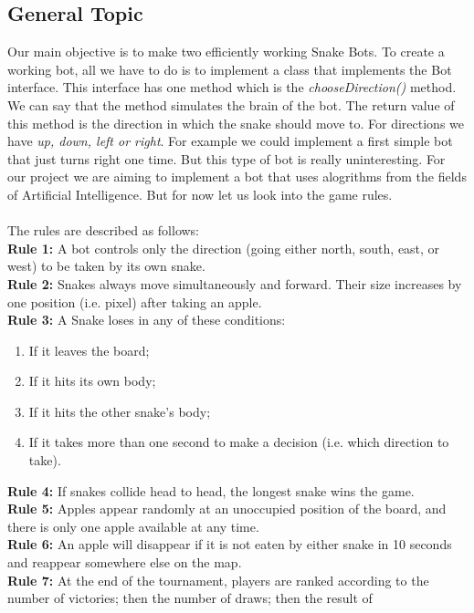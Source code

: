 \documentclass[a4paper,12pt]{article}
\begin{document}
\subsection{General Topic}
Our main objective is to make two efficiently working Snake Bots. To create a working bot, all we have to do is to implement a class that implements the Bot interface. This interface has one method which is the \textit{chooseDirection()} method. We can say that the method simulates the brain of the bot. The return value of this method is the direction in which the snake should move to. For directions we have \textit{up, down, left or right}. For example we could implement a first simple bot that just turns right one time. But this type of bot is really uninteresting. For our project we are aiming to implement a bot that uses alogrithms from the fields of Artificial Intelligence. But for now let us look into the game rules.\\
\\The rules are described as follows: \\
\textbf{Rule 1:}  A bot controls only the direction (going either north, south, east, or west) to
be taken by its own snake.\\
\textbf{Rule 2:} Snakes always move simultaneously and forward. Their size increases by one position
(i.e. pixel) after taking an apple.\\
\textbf{Rule 3:} A Snake loses in any of these conditions:\\
\begin{enumerate}
\item If it leaves the board;
\item If it hits its own body;
\item If it hits the other snake's body;
\item If it takes more than one second to make a decision (i.e. which direction to take).
\end{enumerate}
\textbf{Rule 4:} If snakes collide head to head, the longest snake wins the game.\\
\textbf{Rule 5:} Apples appear randomly at an unoccupied position of the board, and there is only
one apple available at any time.\\
\textbf{Rule 6:} An apple will disappear if it is not eaten by either snake in 10 seconds and reappear
somewhere else on the map.\\
\textbf{Rule 7:} At the end of the tournament, players are ranked according to the number of
victories; then the number of draws; then the result of\\
\end{document}
